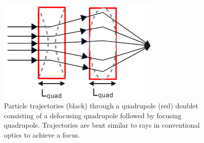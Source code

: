 \documentclass[../main.tex]{subfiles}
\begin{document}
\begin{figure}[!h]
\centering
\includegraphics[width=0.7\textwidth]{Figures/Energy_Recovery_Linac_Design/Quad_Doublet_fixed_V2.pdf}
\caption{Particle trajectories (black) through a quadrupole (red) doublet consisting of a defocusing quadrupole followed by focusing quadrupole. Trajectories are bent similar to rays in conventional optics to achieve a focus.}
\label{fig:quad_doublet}
\end{figure}
\end{document}
